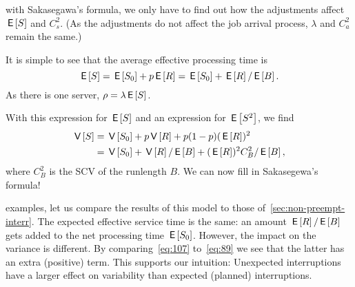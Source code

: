  with Sakasegawa's formula, we only have to find out how the adjustments affect  $\,\mathsf{E}\left[S\right]$ and $C_s^2$.
(As the adjustments do not affect the job arrival process, $\lambda$ and $C_a^{2}$ remain the same.)

It is simple to see that the average effective processing time is
\begin{equation} \label{eq:88}
 \,\mathsf{E}\left[S\right] = \,\mathsf{E}\left[S_0\right] + p \,\mathsf{E}\left[R\right] = \,\mathsf{E}\left[S_0\right] + \,\mathsf{E}\left[R\right] / \,\mathsf{E}\left[B\right].
\end{equation}
As there is one server,  $\rho = \lambda \,\mathsf{E}\left[S\right]$.

With this expression for $\,\mathsf{E}\left[S\right]$ and an expression for $\,\mathsf{E}\left[S^2\right]$, we find
\begin{equation}\label{eq:89}
  \begin{split}
 \,\mathsf{V}\left[S\right]
&= \,\mathsf{V}\left[S_0\right] + p\,\mathsf{V}\left[R\right] + p (1-p)(\,\mathsf{E}\left[R\right])^2 \\
&= \,\mathsf{V}\left[S_0\right] + \,\mathsf{V}\left[R\right] / \,\mathsf{E}\left[B\right] + (\,\mathsf{E}\left[R\right])^2C_B^2/\,\mathsf{E}\left[B\right],
 \end{split}
\end{equation}
where $C_B^2$ is the SCV of the runlength $B$.
We can now  fill in Sakasegewa's formula!


 examples, let us compare the results of this model to those of~\cref{sec:non-preempt-interr}.
The expected effective service time is the same: an amount $\,\mathsf{E}\left[R\right]/ \,\mathsf{E}\left[B\right]$ gets added to the net processing time $\,\mathsf{E}\left[S_0\right]$.
However, the impact on the variance is different.
By comparing~\cref{eq:107} to~\cref{eq:89} we see that the latter has an extra (positive) term.
This supports our intuition: Unexpected interruptions have a larger effect on variability than expected (planned) interruptions.


